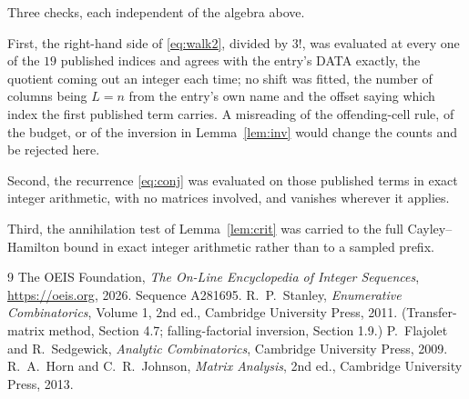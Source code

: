 \documentclass[11pt,a4paper]{article}
\theoremstyle{plain}
\theoremstyle{definition}
\begin{document}
Three checks, each independent of the algebra above.

First, the right-hand side of \eqref{eq:walk2}, divided by $3!$, was evaluated at every
one of the $19$ published indices and agrees with the entry's DATA exactly, the quotient
coming out an integer each time; no shift was fitted, the number of columns being
$L=n$ from the entry's own name and the offset saying which index the first published
term carries. A misreading of the offending-cell rule, of the budget, or of the inversion in
Lemma~\ref{lem:inv} would change the counts and be rejected here.

Second, the recurrence \eqref{eq:conj} was evaluated on those published terms in exact
integer arithmetic, with no matrices involved, and vanishes wherever it applies.

Third, the annihilation test of Lemma~\ref{lem:crit} was carried to the full
Cayley--Hamilton bound in exact integer arithmetic rather than to a sampled prefix.

\begin{thebibliography}{9}
 The OEIS Foundation, \emph{The On-Line Encyclopedia of Integer
Sequences}, \url{https://oeis.org}, 2026. Sequence A281695.
 R.~P.~Stanley, \emph{Enumerative Combinatorics}, Volume 1, 2nd ed.,
Cambridge University Press, 2011. (Transfer-matrix method, Section 4.7; falling-factorial
inversion, Section 1.9.)
 P.~Flajolet and R.~Sedgewick, \emph{Analytic Combinatorics}, Cambridge
University Press, 2009.
 R.~A.~Horn and C.~R.~Johnson, \emph{Matrix Analysis}, 2nd ed., Cambridge
University Press, 2013.
\end{thebibliography}
\end{document}
